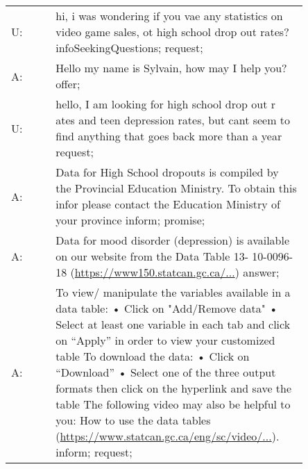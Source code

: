 \documentclass[11pt]{article}
\begin{document}
\begin{table}[h]
    \small
    \centering
    \begin{tabular}{l p{0.85\linewidth}}
\toprule

U: & hi, i was wondering if you vae any statistics on video game sales, ot high school drop out rates? {\color{blue} infoSeekingQuestions; request;} 
\\ A: & Hello my name is Sylvain, how may I help you? {\color{blue} offer;}
\\ U: & hello, I am looking for high school drop out r ates and teen depression rates, but cant seem to find anything that goes back more than a year {\color{blue} request;}
\\ A: & Data for High School dropouts is compiled by the Provincial Education Ministry. To obtain this infor please contact the Education Ministry of your province {\color{blue} inform; promise;}
\\ A: & Data for mood disorder (depression) is available on our website from the Data Table 13- 10-0096-18 (\href{https://www150.statcan.gc.ca/t1/tbl1/en/tv.action?pid=1310009618}{https://www150.statcan.gc.ca/...}) {\color{blue} answer;}
\\ A: & To view/ manipulate the variables available in a data table: • Click on "Add/Remove data" • Select at least one variable in each tab and click on “Apply” in order to view your customized table To download the data: • Click on “Download” • Select one of the three output formats then click on the hyperlink and save the table The following video may also be helpful to you: How to use the data tables (\href{https://www.statcan.gc.ca/eng/sc/video/howto}{https://www.statcan.gc.ca/eng/sc/video/...}). {\color{blue} inform; request;}
\\

\midrule


\end{tabular}
\end{table}
\end{document}
